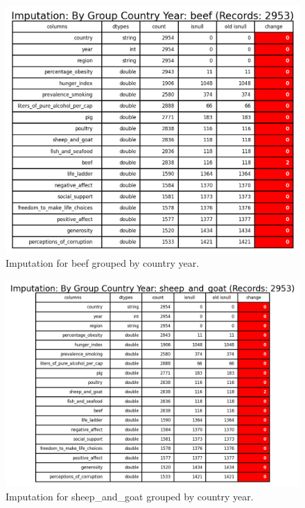                 \begin{figure}[H]
                        \centering
                        \includegraphics[scale=1]{images/dp_imputation_c_y_beef}
                        \caption{Imputation for beef grouped by country year.}
                        \label{fig:dp-impute-group-beef}
                \end{figure}

                \begin{figure}[H]
                        \centering
                        \includegraphics[scale=1]{images/dp_imputation_c_y_sheep_and_goat}
                        \caption{Imputation for sheep\_and\_goat grouped by country year.}
                        \label{fig:dp-impute-group-shep_and_goatl}
                \end{figure}

